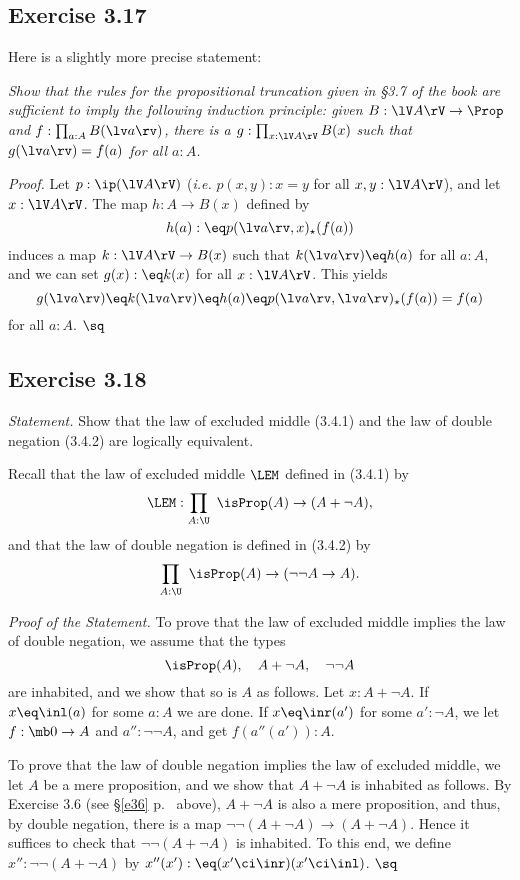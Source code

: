 \documentclass[12pt]{article}
\begin{document}

\subsection{Exercise 3.17}\label{317}

Here is a slightly more precise statement:

\emph{Show that the rules for the propositional truncation given in \S3.7 of the book are sufficient to imply the following induction principle: given $B:\lV A\rV\to\Prop$ and $f:\prod_{a:A}B(\lv a\rv)$, there is a $g:\prod_{x:\lV A\rV}B(x)$ such that $g(\lv a\rv)=f(a)$ for all $a:A$.}

\nn\emph{Proof.} Let $p:\ip(\lV A\rV)$ (\emph{i.e.} $p(x,y):x=y$ for all $x,y:\lV A\rV$), and let $x:\lV A\rV$. The map $h:A\to B(x)$ defined by 
$$
h(a):\eq p(\lv a\rv,x)_\star(f(a))
$$ 
induces a map $k:\lV A\rV\to B(x)$ such that $k(\lv a\rv)\eq h(a)$ for all $a:A$, and we can set $g(x):\eq k(x)$ for all $x:\lV A\rV$. This yields 
$$
g(\lv a\rv)\eq k(\lv a\rv)\eq h(a)\eq p(\lv a\rv,\lv a\rv)_\star(f(a))=f(a)
$$ 
for all $a:A$. $\sq$


\subsection{Exercise 3.18}

\emph{Statement.} Show that the law of excluded middle (3.4.1) and the law of double negation (3.4.2) are logically equivalent.

Recall that the law of excluded middle $\LEM$ defined in (3.4.1) by 
$$
\LEM:\prod_{A:\U}\ \isProp(A)\to(A+\neg A),
$$ 
and that the law of double negation is defined in (3.4.2) by 
$$
\prod_{A:\U}\ \isProp(A)\to(\neg\neg A\to A).
$$ 

\nn\emph{Proof of the Statement.} To prove that the law of excluded middle implies the law of double negation, we assume that the types 
$$
\isProp(A),\quad A+\neg A,\quad \neg\neg A
$$ 
are inhabited, and we show that so is $A$ as follows. Let $x:A+\neg A$. If $x\eq\inl(a)$ for some $a:A$ we are done. If $x\eq\inr(a')$ for some $a':\neg A$, we let $f:\mb0\to A$ and $a'':\neg\neg A$, and get $f(a''(a')):A$. 

To prove that the law of double negation implies the law of excluded middle, we let $A$ be a mere proposition, and we show that $A+\neg A$ is inhabited as follows. By Exercise 3.6 (see \S\ref{e36} p.~\pageref{e36} above), $A+\neg A$ is also a mere proposition, and thus, by double negation, there is a map $\neg\neg(A+\neg A)\to(A+\neg A)$. Hence it suffices to check that $\neg\neg(A+\neg A)$ is inhabited. To this end, we define $x'':\neg\neg(A+\neg A)$ by $x''(x'):\eq(x'\ci\inr)(x'\ci\inl)$. $\sq$
\end{document}
